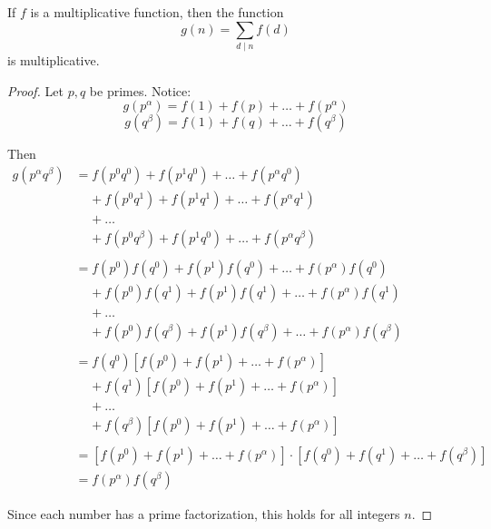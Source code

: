 
\begin{prop}[part a]
    If $f$ is a multiplicative function, then the function
    \[ g(n) = \sum_{d \mid n} f(d) \]
    is multiplicative.
\end{prop}
\begin{proof}
    Let $p, q$ be primes.  Notice:
    \[ g(p^\alpha) = f(1) + f(p) + \ldots + f(p^\alpha) \]
    \[ g(q^\beta) = f(1) + f(q) + \ldots + f(q^\beta) \]
    
    Then
    \begin{align*}
    g(p^\alpha q^\beta) 
        &= f(p^0 q^0) + f(p^1 q^0) + \dots + f(p^\alpha q^0) \\
        & \;\;\;\; + f(p^0 q^1) + f(p^1 q^1) + \dots + f(p^\alpha q^1) \\
        & \;\;\;\; + \dots \\
        & \;\;\;\; + f(p^0 q^\beta) + f(p^1 q^0) + \ldots + f(p^\alpha q^\beta) \\
        \\    
        &= f(p^0)f(q^0) + f(p^1)f(q^0) + \dots + f(p^\alpha)f(q^0) \\
        & \;\;\;\; + f(p^0)f(q^1) + f(p^1)f(q^1) + \dots + f(p^\alpha)f(q^1) \\
        & \;\;\;\; + \dots \\
        & \;\;\;\; + f(p^0)f(q^\beta) + f(p^1)f(q^\beta) + \dots + f(p^\alpha)f(q^\beta) \\
        \\
        &= f(q^0)[f(p^0) + f(p^1) + \ldots + f(p^\alpha)] \\
        & \;\;\;\; + f(q^1)[f(p^0) + f(p^1) + \ldots + f(p^\alpha)] \\
        & \;\;\;\; + \ldots \\
        & \;\;\;\; + f(q^\beta)[f(p^0) + f(p^1) + \ldots + f(p^\alpha)] \\
        \\
        &= [f(p^0) + f(p^1) + \ldots + f(p^\alpha)] \cdot [f(q^0) + f(q^1) + \ldots + f(q^\beta)] \\
        &= f(p^\alpha)f(q^\beta)
    \end{align*}
    
    Since each number has a prime factorization, this holds for all integers
    $n$.
\end{proof}


